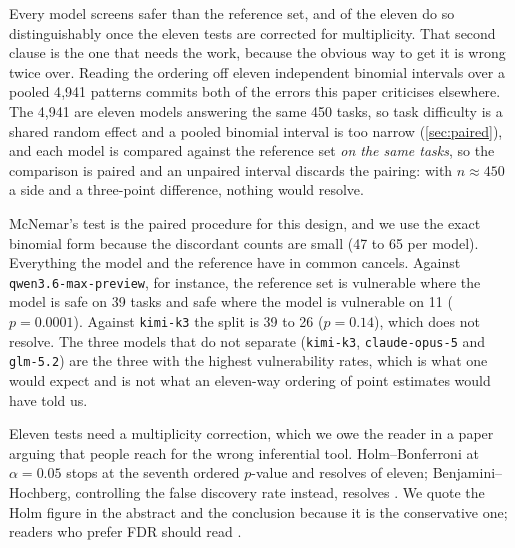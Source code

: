 \documentclass[11pt]{article}
\newcommand{\vuln}{\textsc{vulnerable}}
\begin{document}
\begin{table}[htbp]
\centering
\small

\caption{ReDoS screening of model outputs against the corpus's own
human-written reference patterns, one pattern per task in all cases, that is
the first sample and not a mean over the three. The human side has one answer per
task, so a mean would compare an average of three attempts against a single
attempt; \cref{tab:at1} reports the three-sample estimators separately, which
is why its $\vuln{}@1$ column differs from this table's rate. The final
column is the exact McNemar test against the reference set on the same tasks;
see below for why an independent interval would be the wrong instrument here.}
\label{tab:vuln}
\end{table}

Every model screens safer than the reference set, and \holmcount{} of the
eleven do so distinguishably once the eleven tests are corrected for
multiplicity. That second clause is the one that needs the work, because the
obvious way to get it is wrong twice over. Reading the ordering off eleven
independent binomial intervals over a pooled 4{,}941 patterns commits both of
the errors this paper criticises elsewhere. The
4{,}941 are eleven models answering the same 450 tasks, so task difficulty is
a shared random effect and a pooled binomial interval is too narrow
(\cref{sec:paired}), and each model is compared against the reference set
\emph{on the same tasks}, so the comparison is paired and an unpaired interval
discards the pairing: with $n \approx 450$ a side and a three-point
difference, nothing would resolve.

McNemar's test is the paired procedure for this design, and we use the exact
binomial form because the discordant counts are small (47 to 65 per model).
Everything the model and the reference have in common cancels. Against
\texttt{qwen3.6-max-preview}, for instance, the reference set is vulnerable
where the model is safe on 39 tasks and safe where the model is vulnerable on
11 ($p = 0.0001$). Against \texttt{kimi-k3} the split is 39 to 26
($p = 0.14$), which does not resolve. The three models that do not separate
(\texttt{kimi-k3}, \texttt{claude-opus-5} and \texttt{glm-5.2}) are the
three with the highest vulnerability rates, which is what one would expect and
is not what an eleven-way ordering of point estimates would have told us.

Eleven tests need a multiplicity correction, which we owe the reader in a
paper arguing that people reach for the wrong inferential tool.
Holm--Bonferroni at $\alpha = 0.05$ stops at the seventh ordered $p$-value and
resolves \holmcount{} of eleven; Benjamini--Hochberg, controlling the false
discovery rate instead, resolves \bhcount{}. We quote the Holm figure in the
abstract and the conclusion because it is the conservative one; readers who
prefer FDR should read \bhcount{}.
\end{document}
